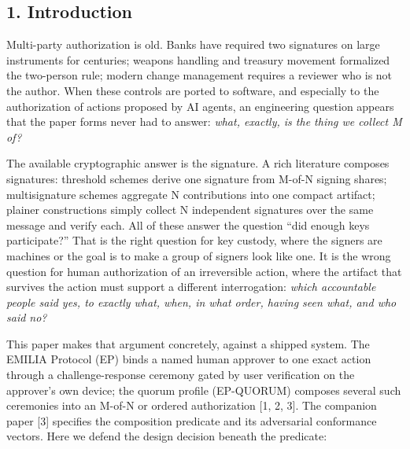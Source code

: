 \documentclass[
  11pt,
]{article}
\begin{document}
\subsection{1. Introduction}\label{introduction}

Multi-party authorization is old. Banks have required two signatures on
large instruments for centuries; weapons handling and treasury movement
formalized the two-person rule; modern change management requires a
reviewer who is not the author. When these controls are ported to
software, and especially to the authorization of actions proposed by AI
agents, an engineering question appears that the paper forms never had
to answer: \emph{what, exactly, is the thing we collect M of?}

The available cryptographic answer is the signature. A rich literature
composes signatures: threshold schemes derive one signature from M-of-N
signing shares; multisignature schemes aggregate N contributions into
one compact artifact; plainer constructions simply collect N independent
signatures over the same message and verify each. All of these answer
the question ``did enough keys participate?'' That is the right question
for key custody, where the signers are machines or the goal is to make a
group of signers look like one. It is the wrong question for human
authorization of an irreversible action, where the artifact that
survives the action must support a different interrogation: \emph{which
accountable people said yes, to exactly what, when, in what order,
having seen what, and who said no?}

This paper makes that argument concretely, against a shipped system. The
EMILIA Protocol (EP) binds a named human approver to one exact action
through a challenge-response ceremony gated by user verification on the
approver's own device; the quorum profile (EP-QUORUM) composes several
such ceremonies into an M-of-N or ordered authorization {[}1, 2, 3{]}.
The companion paper {[}3{]} specifies the composition predicate and its
adversarial conformance vectors. Here we defend the design decision
beneath the predicate:
\end{document}
